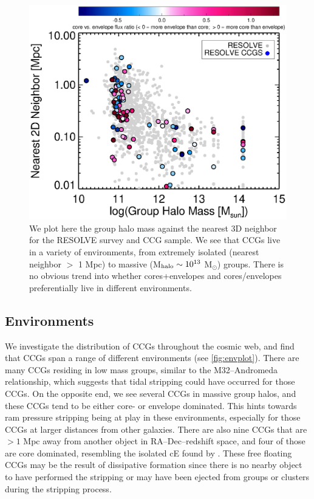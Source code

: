 \documentclass[iop,apj]{emulateapj}
\begin{document}
\begin{figure}[hbpt!]
\begin{center}
\includegraphics{nn_groupmass_2d.eps}
\caption{We plot here the group halo mass against the nearest 3D neighbor for the RESOLVE survey and CCG sample. We see that CCGs live in a variety of environments, from extremely isolated (nearest neighbor $>$ 1 Mpc) to massive (M$_{\rm halo} \sim 10^{13}$ M$_{\odot}$) groups. There is no obvious trend into whether cores+envelopes and cores/envelopes preferentially live in different environments.}
\label{fig:envplot}
\end{center}
\end{figure}

\subsection{Environments}
We investigate the distribution of CCGs throughout the cosmic web, and find that CCGs span a range of different environments (see \autoref{fig:envplot}). There are many CCGs residing in low mass groups, similar to the M32--Andromeda relationship, which suggests that tidal stripping could have occurred for those CCGs. On the opposite end, we see several CCGs in massive group halos, and these CCGs tend to be either core- or envelope dominated. This hints towards ram pressure stripping being at play in these environments, especially for those CCGs at larger distances from other galaxies. There are also nine CCGs that are $>1$ Mpc away from another object in RA--Dec--redshift space, and four of those are core dominated, resembling the isolated cE found by \citet{Huxor2013}. These free floating CCGs may be the result of dissipative formation since there is no nearby object to have performed the stripping or may have been ejected from groups or clusters during the stripping process.
 
\end{document}
